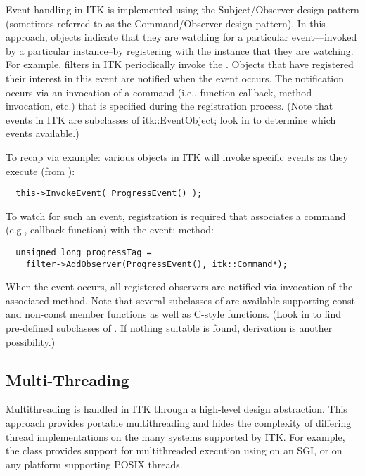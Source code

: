 
Event handling in ITK is implemented using the Subject/Observer design
pattern \cite{Gamma1995} (sometimes referred to as the Command/Observer
design pattern). In this approach, objects indicate that they are watching
for a particular event---invoked by a particular instance--by registering
with the instance that they are watching.  For example, filters in ITK
periodically invoke the . Objects that have registered
their interest in this event are notified when the event occurs. The
notification occurs via an invocation of a command (i.e., function callback,
method invocation, etc.) that is specified during the registration
process. (Note that events in ITK are subclasses of {itk::EventObject}; look
in  to determine which events available.)

To recap via example: various objects in ITK will invoke specific events
as they execute (from ):
\small
\begin{verbatim}
  this->InvokeEvent( ProgressEvent() );
\end{verbatim}
\normalsize

To watch for such an event, registration is required that associates a
command (e.g., callback function) with the event:
 method:
\small
\begin{verbatim}
  unsigned long progressTag = 
    filter->AddObserver(ProgressEvent(), itk::Command*);
\end{verbatim}
\normalsize

When the event occurs, all registered observers are notified via invocation
of the associated  method. Note that several
subclasses of  are available supporting const and
non-const member functions as well as C-style functions. (Look in
 to find pre-defined subclasses of
. If nothing suitable is found, derivation is another
possibility.)

\subsection{Multi-Threading}
\label{sec:MultiThreading}

Multithreading is handled in ITK through a high-level design
abstraction. This approach provides portable multithreading and hides the
complexity of differing thread implementations on the many systems supported
by ITK. For example, the class  provides support for
multithreaded execution using  on an SGI, or
 on any platform supporting POSIX threads. 

